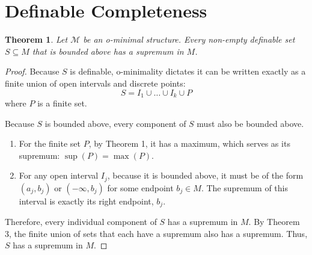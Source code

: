 \documentclass[12pt]{article}
\newtheorem{theorem}{Theorem}
\begin{document}
\section{Definable Completeness}
\begin{theorem}
Let $\mathcal{M}$ be an o-minimal structure. Every non-empty definable set $S \subseteq M$ that is bounded above has a supremum in $M$.
\end{theorem}
\begin{proof}
Because $S$ is definable, o-minimality dictates it can be written exactly as a finite union of open intervals and discrete points:
\[ S = I_1 \cup \dots \cup I_k \cup P \]
where $P$ is a finite set.

Because $S$ is bounded above, every component of $S$ must also be bounded above. 
\begin{enumerate}
    \item For the finite set $P$, by Theorem 1, it has a maximum, which serves as its supremum: $\sup(P) = \max(P)$.
    \item For any open interval $I_j$, because it is bounded above, it must be of the form $(a_j, b_j)$ or $(-\infty, b_j)$ for some endpoint $b_j \in M$. The supremum of this interval is exactly its right endpoint, $b_j$.
\end{enumerate}

Therefore, every individual component of $S$ has a supremum in $M$. By Theorem 3, the finite union of sets that each have a supremum also has a supremum. Thus, $S$ has a supremum in $M$.
\end{proof}
\end{document}
